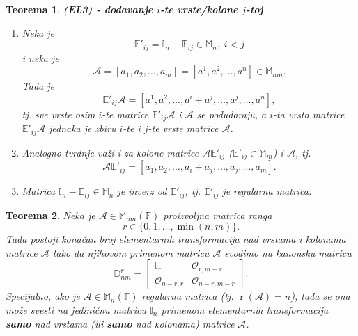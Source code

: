 \documentclass[a4paper,12pt,twoside]{report}
\newtheorem{theorem}{Teorema}[section]
\numberwithin{algorithm}{section}
\begin{document}
\begin{theorem} \textbf{(EL3) - dodavanje $i$-te vrste/kolone $j$-toj}
    \begin{enumerate}
        \item Neka je \[\mathbb{E}'_{ij} = \mathbb{I}_n + \mathbb{E}_{ij} \in \mathbb{M}_n,\; i < j\] i neka je \[\mathcal{A} = [a_1, a_2, \dots, a_m] = [a^1, a^2, \dots, a^n] \in \mathbb{M}_{nm}.\]
            Tada je \[\mathbb{E}'_{ij} \mathcal{A} = [a^1, a^2, \dots, a^i + a^j, \dots, a^j, \dots, a^n],\] tj. sve vrste osim $i$-te matrice $\mathbb{E}'_{ij} \mathcal{A}$ i $\mathcal{A}$ se podudaraju, a $i$-ta vrsta matrice $\mathbb{E}'_{ij} \mathcal{A}$ jednaka je zbiru $i$-te i $j$-te vrste matrice $\mathcal{A}$.

    \item Analogno tvrdnje važi i za kolone matrice $\mathcal{A} \mathbb{E}'_{ij}$ ($\mathbb{E}'_{ij} \in \mathbb{M}_m$) i $\mathcal{A}$, tj. \[\mathcal{A} \mathbb{E}'_{ij} = [a_1, a_2, \dots, a_i + a_j, \dots, a_j, \dots, a_m].\]

    \item Matrica $\mathbb{I}_n - \mathbb{E}_{ij} \in \mathbb{M}_n$ je inverz od $\mathbb{E}'_{ij}$, tj. $\mathbb{E}'_{ij}$ je regularna matrica.
    \end{enumerate}
    \label{rangMatriceTeorema4}
\end{theorem}

\begin{theorem} 
    \label{rangMatriceTeorema5}
    Neka je $\mathcal{A} \in \mathbb{M}_{nm}(\mathbb{F})$ proizvoljna matrica ranga \[r \in \{0, 1, \ldots, \min(n, m)\}.\] Tada postoji konačan broj elementarnih transformacija nad vrstama i kolonama matrice $\mathcal{A}$ tako da njihovom primenom matricu $\mathcal{A}$ svodimo na kanonsku matricu
    \[
    \mathbb{D}_{nm}^r = 
    \begin{bmatrix}
        \mathbb{I}_r & \mathcal{O}_{r, m-r} \\
        \mathcal{O}_{n-r, r} & \mathcal{O}_{n-r, m-r}
    \end{bmatrix}.
    \]
    \medskip
    \noindent Specijalno, ako je $\mathcal{A} \in \mathbb{M}_n(\mathbb{F})$ regularna matrica (tj. $\operatorname{r}(\mathcal{A}) = n$), tada se ona može svesti na jediničnu matricu $\mathbb{I}_n$ primenom elementarnih transformacija \textbf{samo} nad vrstama (ili \textbf{samo} nad kolonama) matrice $\mathcal{A}$.
\end{theorem}\
\end{document}
